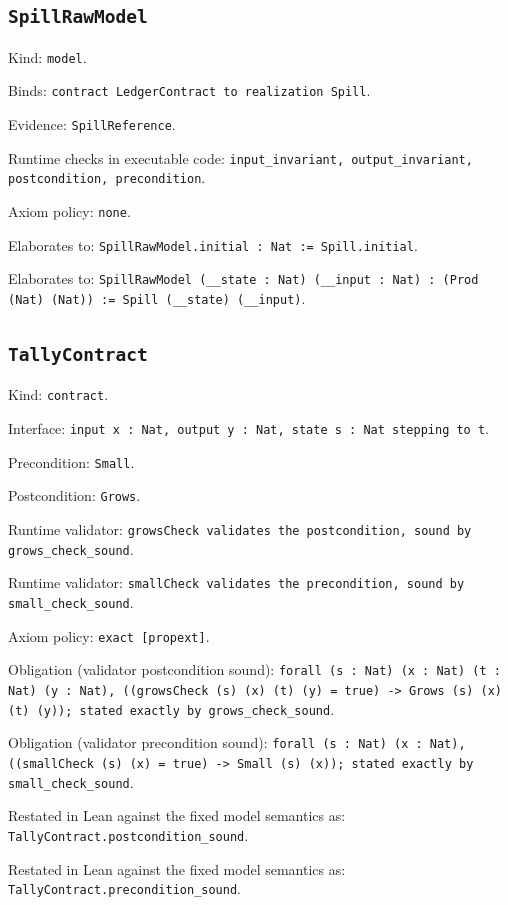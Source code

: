 \documentclass[11pt]{article}
\begin{document}
\subsection*{\texttt{SpillRawModel}}
\noindent Kind: \texttt{model}.\par
\noindent Binds: \texttt{contract LedgerContract to realization Spill}.\par
\noindent Evidence: \texttt{SpillReference}.\par
\noindent Runtime checks in executable code: \texttt{input\_invariant, output\_invariant, postcondition, precondition}.\par
\noindent Axiom policy: \texttt{none}.\par
\noindent Elaborates to: \texttt{SpillRawModel.initial : Nat := Spill.initial}.\par
\noindent Elaborates to: \texttt{SpillRawModel (\_\_state : Nat) (\_\_input : Nat) : (Prod (Nat) (Nat)) := Spill (\_\_state) (\_\_input)}.\par
\subsection*{\texttt{TallyContract}}
\noindent Kind: \texttt{contract}.\par
\noindent Interface: \texttt{input x : Nat, output y : Nat, state s : Nat stepping to t}.\par
\noindent Precondition: \texttt{Small}.\par
\noindent Postcondition: \texttt{Grows}.\par
\noindent Runtime validator: \texttt{growsCheck validates the postcondition, sound by grows\_check\_sound}.\par
\noindent Runtime validator: \texttt{smallCheck validates the precondition, sound by small\_check\_sound}.\par
\noindent Axiom policy: \texttt{exact [propext]}.\par
\noindent Obligation (validator postcondition sound): \texttt{forall (s : Nat) (x : Nat) (t : Nat) (y : Nat), ((growsCheck (s) (x) (t) (y) = true) -> Grows (s) (x) (t) (y)); stated exactly by grows\_check\_sound}.\par
\noindent Obligation (validator precondition sound): \texttt{forall (s : Nat) (x : Nat), ((smallCheck (s) (x) = true) -> Small (s) (x)); stated exactly by small\_check\_sound}.\par
\noindent Restated in Lean against the fixed model semantics as: \texttt{TallyContract.postcondition\_sound}.\par
\noindent Restated in Lean against the fixed model semantics as: \texttt{TallyContract.precondition\_sound}.\par
\end{document}
